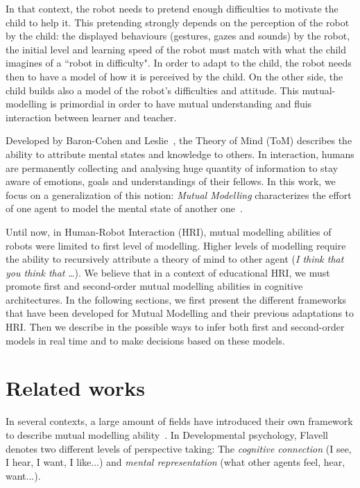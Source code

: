 \documentclass[conference]{IEEEtran}
\begin{document}
In that context, the robot needs to pretend enough difficulties to motivate the child to help it. 
This pretending strongly depends on the perception of the robot by the child: the displayed behaviours (gestures, gazes and sounds) by the robot, the initial level and learning speed of the robot must match with what the child imagines of a ``robot in difficulty".
In order to adapt to the child, the robot needs then to have a model of how it is perceived by the child. On the other side, the child builds also a model of the robot's difficulties and attitude. 
This mutual-modelling is primordial in order to have mutual understanding and fluis interaction between learner and teacher. 


Developed by Baron-Cohen and Leslie~\cite{baron1985does}, the Theory of Mind (ToM) describes the ability to attribute mental states and knowledge to others. 
In interaction, humans are permanently collecting and analysing huge quantity of information to stay aware of emotions, goals and understandings of their fellows. 
In this work, we focus on a generalization of this notion: \emph{Mutual Modelling} characterizes the effort of one agent to model the mental state of another one~\cite{dillenbourg1999you}. 

Until now, in Human-Robot Interaction (HRI), mutual modelling abilities of robots were limited to first level of modelling. 
Higher levels of modelling require the ability to recursively attribute a theory of mind to other agent (\textit{I think that you think that} \dots).  
We believe that in a context of educational HRI, we must promote first and second-order mutual modelling abilities in cognitive architectures. In the following sections, we first present the different frameworks that have been developed for Mutual Modelling and their previous adaptations to HRI. Then we describe in the possible ways to infer both first and second-order models in real time and to make decisions based on these models. 

\section{Related works}

In several contexts, a large amount of fields have introduced their own framework to describe mutual modelling ability~\cite{lemaignan2015mutual}. 
In Developmental psychology, Flavell~\cite{flavell1990developmental} denotes two different levels of perspective taking: The \textit{cognitive connection} (I see, I hear, I want, I like...) and \textit{mental representation} (what other agents feel, hear, want...).
\end{document}
